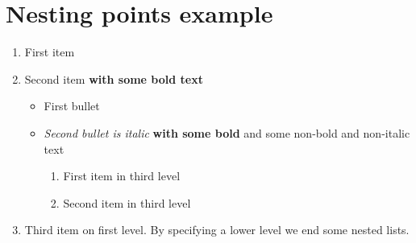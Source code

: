 \documentclass[a4paper]{report}
\begin{document}
\chapter{Nesting points example}
\begin{enumerate}
\item First item
\item Second item\textbf{ with some bold text}
\begin{itemize}
\item First bullet
\item \textit{Second bullet is italic}\textbf{ with some bold} and some non-bold and non-italic text
\begin{enumerate}
\item First item in third level
\item Second item in third level
\end{enumerate}
\end{itemize}
\item Third item on first level. By specifying a lower level we end some nested lists.
\end{enumerate}
\end{document}
